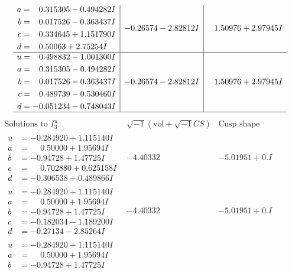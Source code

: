 \documentclass[1p]{elsarticle_modified}
\theoremstyle{definition}
\newcommand{\I}{\sqrt{-1}}
\begin{document}
$$\begin{array}{c|c|c}
\begin{aligned}
a &= \phantom{-}0.315305 - 0.494282 I \\
b &= \phantom{-}0.017526 - 0.363437 I \\
c &= \phantom{-}0.334645 + 1.151790 I \\
d &= \phantom{-}0.50063 + 2.75254 I\end{aligned}
 & -0.26574 - 2.82812 I & \phantom{-}1.50976 + 2.97945 I \\ \hline\begin{aligned}
u &= \phantom{-}0.498832 - 1.001300 I \\
a &= \phantom{-}0.315305 - 0.494282 I \\
b &= \phantom{-}0.017526 - 0.363437 I \\
c &= \phantom{-}0.489739 - 0.530460 I \\
d &= -0.051234 - 0.748043 I\end{aligned}
 & -0.26574 - 2.82812 I & \phantom{-}1.50976 + 2.97945 I\\
 \hline 
 \end{array}$$\newpage$$\begin{array}{c|c|c}  
\text{Solutions to }I^u_{3}& \I (\text{vol} + \sqrt{-1}CS) & \text{Cusp shape}\\
 \hline 
\begin{aligned}
u &= -0.284920 + 1.115140 I \\
a &= \phantom{-}0.50000 + 1.95694 I \\
b &= -0.94728 + 1.47725 I \\
c &= \phantom{-}0.702880 + 0.625158 I \\
d &= -0.306538 + 0.489866 I\end{aligned}
 & -4.40332\phantom{ +0.000000I} & -5.01951 + 0. I\phantom{ +0.000000I} \\ \hline\begin{aligned}
u &= -0.284920 + 1.115140 I \\
a &= \phantom{-}0.50000 + 1.95694 I \\
b &= -0.94728 + 1.47725 I \\
c &= -0.182034 - 1.189200 I \\
d &= -0.27134 - 2.85264 I\end{aligned}
 & -4.40332\phantom{ +0.000000I} & -5.01951 + 0. I\phantom{ +0.000000I} \\ \hline\begin{aligned}
u &= -0.284920 + 1.115140 I \\
a &= \phantom{-}0.50000 + 1.95694 I \\
b &= -0.94728 + 1.47725 I \\

\end{aligned}
\end{array}$$
\end{document}
